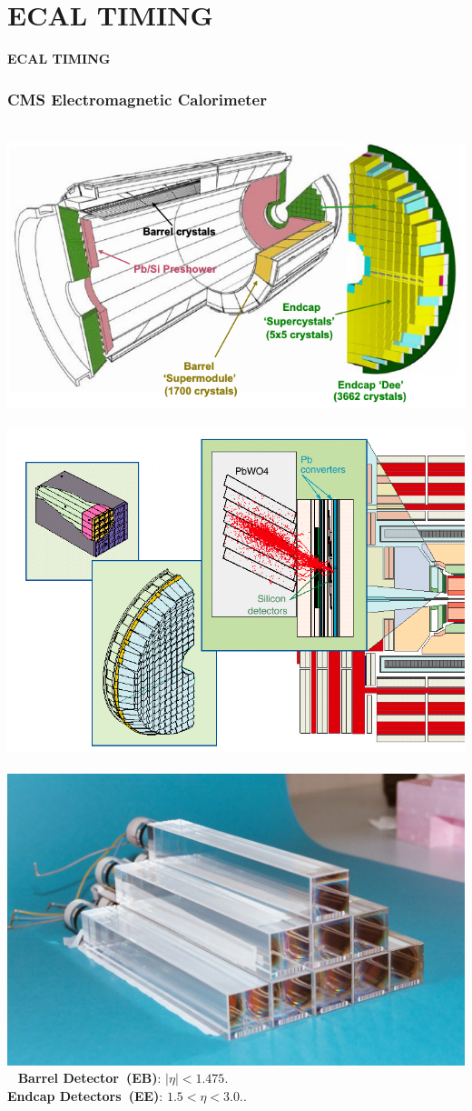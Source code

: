 \documentclass{beamer}
\begin{document}
\section{ECAL TIMING}
{
\begin{frame}
   \begin{center}
    \textcolor{UMN@Maroon}{\huge{\textbf{ECAL TIMING}}}
   \end{center}
\end{frame}
}


\begin{frame}
 \frametitle{CMS Electromagnetic Calorimeter}
    \begin{tcolorbox}[colback=UNL@Cream!5,colframe=UNL@Cream!70,title=\textcolor{UMN@Maroon}{\textbf{ECAL Detector.}}]
    \mbox{    
    \includegraphics[height=0.25\textwidth,width=0.35\linewidth]{THESISPLOTS/CMS-ECAL-EB-EE.png} \quad
    \includegraphics[height=0.25\textwidth,width=0.30\linewidth]{THESISPLOTS/New-Physics-PLOTS/ECAL_Crystals.png} \quad
    \includegraphics[height=0.25\textwidth,width=0.30\linewidth]{THESISPLOTS/New-Physics-PLOTS/CMS-ECAL-CRYS.jpg}
    }
 \textbf{Barrel Detector~(EB)}:  $|\eta| < 1.475$. \quad \\
  \textbf{Endcap Detectors~(EE)}: $1.5 < \eta < 3.0$..
  

\end{tcolorbox}
\end{frame}
\end{document}
